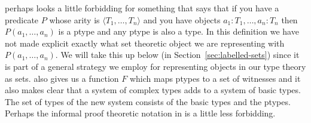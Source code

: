 \preveg{} perhaps looks a little forbidding for something that says
that if you have a predicate $P$ whose arity is $\langle
T_1,\ldots,T_n\rangle$ and you have objects $a_1:T_1,\ldots,a_n:T_n$
then $P(a_1,\ldots,a_n)$ is a ptype and any ptype is also a type.  In
this definition we have not made explicit exactly what set theoretic
object we are representing with $P(a_1,\ldots,a_n)$.  We will take
this up below (in Section~\ref{sec:labelled-sets}) since it is part of
a general strategy we employ for representing objects in our type
theory as sets.  
\preveg{} also gives us a function $F$ which maps ptypes to a set of
witnesses and it also makes clear that a system of complex types adds
to a system of basic types.  The set of types of the new system
consists of the basic types and the ptypes.  Perhaps the informal
proof theoretic notation in \nexteg{} is a little less forbidding.
